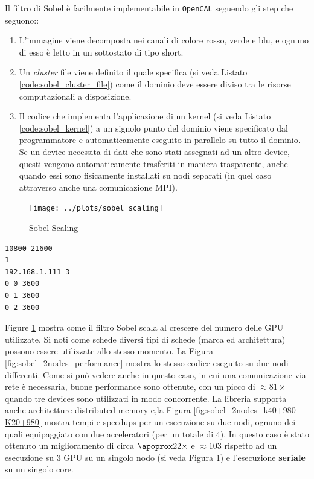 Il filtro di Sobel è facilmente implementabile in \texttt{OpenCAL} seguendo gli step che seguono::
\begin{enumerate}
	\item L'immagine viene decomposta nei canali di colore rosso, verde e blu, e ognuno di esso è letto in un sottostato di tipo short.
	\item Un \textit{cluster} file viene definito il quale specifica (si veda Listato \ref{code:sobel_cluster_file}) come il dominio deve essere diviso tra le risorse computazionali a disposizione.
	\item Il codice che implementa l'applicazione di un kernel (si veda Listato \ref{code:sobel_kernel}) a un signolo punto del dominio viene specificato dal programmatore e automaticamente eseguito in parallelo su tutto il dominio. Se un device necessita di dati che sono stati assegnati ad un altro device, questi vengono automaticamente trasferiti in maniera trasparente, anche quando essi sono fisicamente installati su nodi separati (in quel caso attraverso anche una comunicazione MPI).
\end{enumerate}
\begin{figure}
	\centering
	\caption{Sobel Scaling}
	\label{fig:sobel_scaling}
	\texttt{[image: ../plots/sobel\_scaling]}
\end{figure}
\begin{lstlisting}[float]
10800 21600
1
192.168.1.111 3
0 0 3600
0 1 3600
0 2 3600
\end{lstlisting}
Figure \ref{fig:sobel_scaling} mostra come il filtro Sobel scala al crescere del numero delle GPU utilizzate. Si noti come schede diversi tipi di schede (marca ed architettura) possono essere utilizzate allo stesso momento.
La  Figura \ref{fig:sobel_2nodes_performance} mostra lo stesso codice eseguito su due nodi differenti. Come si può vedere anche in questo caso, in cui una comunicazione via rete è necessaria, buone performance sono ottenute, con un picco di $\approx 81\times$ quando tre devices sono utilizzati in modo concorrente.
La libreria supporta anche architetture distributed memory e,la Figura \ref{fig:sobel_2nodes_k40+980-K20+980} mostra tempi e speedups per un esecuzione su due nodi, ognuno dei quali equipaggiato con due acceleratori (per un totale di $4$). 
In questo caso è stato ottenuto un miglioramento di circa $\apoprox 22 \times$ e $\approx 103$ rispetto ad un esecuzione su $3$ GPU su un singolo nodo (si veda Figura \ref{fig:sobel_scaling}) e l'esecuzione \textbf{seriale} su un singolo core.
